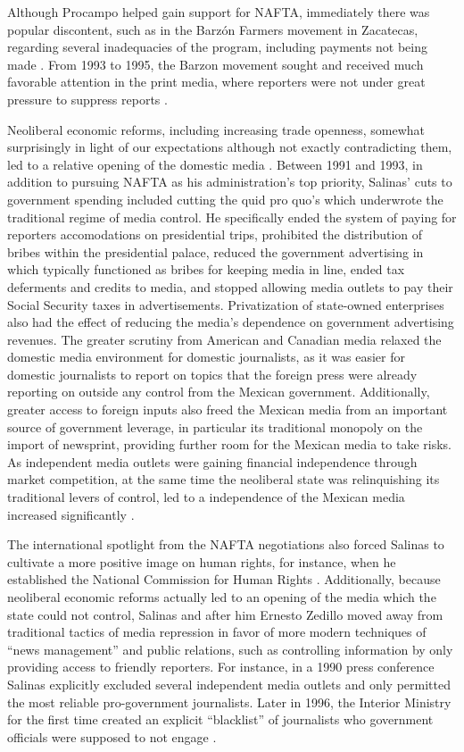 \documentclass[12pt,a4paper]{article}\usepackage[]{graphicx}\usepackage[]{color}
\begin{document}
Although Procampo helped gain support for NAFTA, immediately there was popular discontent, such as in the Barzón Farmers movement in Zacatecas, regarding several inadequacies of the program, including payments not being made \parencite[173]{Williams:2001ux}. From 1993 to 1995, the Barzon movement sought and received much favorable attention in the print media, where reporters were not under great pressure to suppress reports \parencite[187]{Williams:2001ux}.

Neoliberal economic reforms, including increasing trade openness, somewhat surprisingly in light of our expectations although not exactly contradicting them, led to a relative opening of the domestic media \parencite{lawson2002building}. Between 1991 and 1993, in addition to pursuing NAFTA as his administration's top priority, Salinas' cuts to government spending included cutting the quid pro quo's which underwrote the traditional regime of media control. He specifically ended the system of paying for reporters accomodations on presidential trips, prohibited the distribution of bribes within the presidential palace, reduced the government advertising in which typically functioned as bribes for keeping media in line, ended tax deferments and credits to media, and stopped allowing media outlets to pay their Social Security taxes in advertisements. Privatization of state-owned enterprises also had the effect of reducing the media's dependence on government advertising revenues. The greater scrutiny from American and Canadian media relaxed the domestic media environment for domestic journalists, as it was easier for domestic journalists to report on topics that the foreign press were already reporting on outside any control from the Mexican government. Additionally, greater access to foreign inputs also freed the Mexican media from an important source of government leverage, in particular its traditional monopoly on the import of newsprint, providing further room for the Mexican media to take risks. As independent media outlets were gaining financial independence through market competition, at the same time the neoliberal state was relinquishing its traditional levers of control, led to a independence of the Mexican media increased significantly \parencite[76,89]{lawson2002building}.

The international spotlight from the NAFTA negotiations also forced Salinas to cultivate a more positive image on human rights, for instance, when he established the National Commission for Human Rights \parencite[107]{Dominguez:2009wd}. Additionally, because neoliberal economic reforms actually led to an opening of the media which the state could not control, Salinas and after him Ernesto Zedillo moved away from traditional tactics of media repression in favor of more modern techniques of “news management” and public relations, such as controlling information by only providing access to friendly reporters. For instance, in a 1990 press conference Salinas explicitly excluded several independent media outlets and only permitted the most reliable pro-government journalists. Later in 1996, the Interior Ministry for the first time created an explicit “blacklist” of journalists who government officials were supposed to not engage \parencite[39]{lawson2002building}.
\end{document}
